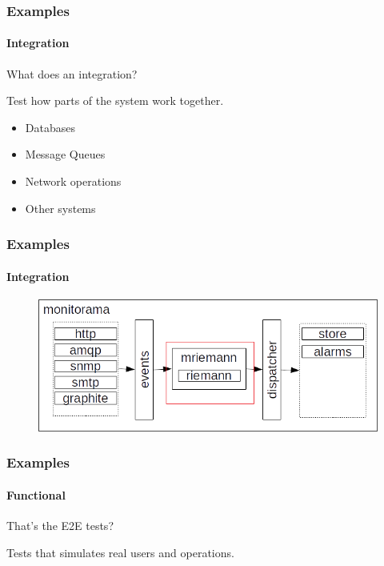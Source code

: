 \documentclass{beamer}
\begin{document}
  \begin{frame}
    \frametitle{Examples}
    \framesubtitle{Integration}
    
    \begin{block}{}      
    What does an integration? \pause
    \end{block}
    
    \begin{alertblock}{}
    Test how parts of the system work together.
    \end{alertblock}
    
    \begin{examples}
    \begin{itemize}
    \item Databases
    \item Message Queues
    \item Network operations
    \item Other systems    
    \end{itemize}

    \end{examples}
        
  \end{frame}
  
  \begin{frame}
    \frametitle{Examples}
    \framesubtitle{Integration}
    
    \begin{figure}[t]
    \includegraphics[scale=0.5]{img/ex1.png}
    \centering
    \end{figure}
    
  \end{frame}

  \begin{frame}
    \frametitle{Examples}
    \framesubtitle{Functional}
    
    \begin{block}{}      
    That's the E2E tests? \pause
    \end{block}
    
    \begin{alertblock}{}
    Tests that simulates real users and operations.
    \end{alertblock}
        
  \end{frame}
  
\end{document}
